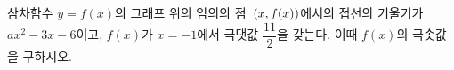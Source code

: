 삼차함수 $y=f(x)$의 그래프 위의 임의의 점~$(x{,}\mkern3mu\mathopen{}f(x))$에서의 접선의 기울기가 $ax^2-3x-6$이고, $f(x)$가 $x=-1$에서 극댓값 $\dfrac{11}{2}$을 갖는다. 이때 $f(x)$의 극솟값을 구하시오. 
